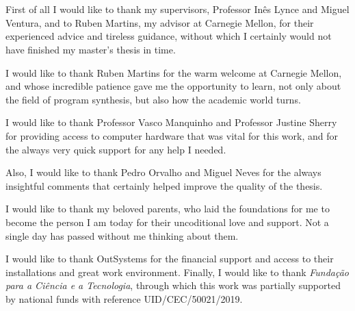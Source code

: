 \section*{\acknowledgments}


First of all I would like to thank my supervisors, Professor Inês Lynce and
Miguel Ventura, and to Ruben Martins, my advisor at Carnegie Mellon, for their
experienced advice and tireless guidance, without which I certainly would not
have finished my master's thesis in time.

I would like to thank Ruben Martins for the warm welcome at Carnegie Mellon, and
whose incredible patience gave me the opportunity to learn, not only about the
field of program synthesis, but also how the academic world turns.

I would like to thank Professor Vasco Manquinho and Professor Justine Sherry for
providing access to computer hardware that was vital for this work, and for the
always very quick support for any help I needed.

Also, I would like to thank Pedro Orvalho and Miguel Neves for the always
insightful comments that certainly helped improve the quality of the thesis.

I would like to thank my beloved parents, who laid the foundations for me to
become the person I am today for their uncoditional love and support.
Not a single day has passed without me thinking about them.

I would like to thank OutSystems for the financial support and access to their
installations and great work environment.
Finally, I would like to thank \textit{Fundação para a Ciência e a Tecnologia},
through which this work was partially supported by national funds with reference
UID/CEC/50021/2019.

\cleardoublepage
